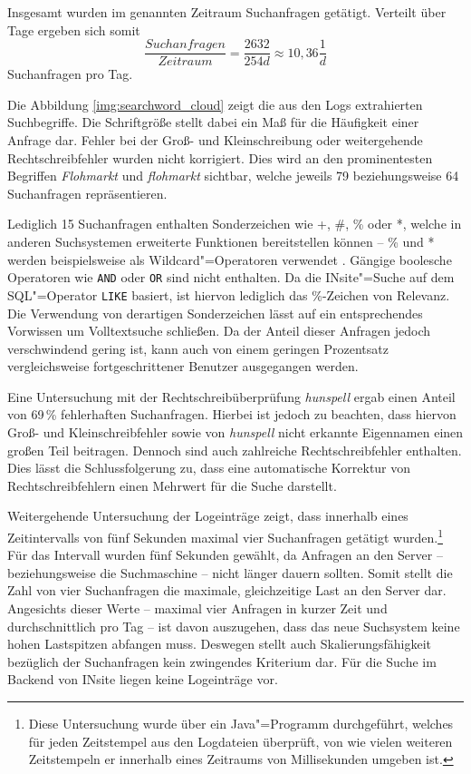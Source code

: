 Insgesamt wurden im genannten Zeitraum  Suchanfragen getätigt. Verteilt über  Tage ergeben sich somit
\begin{equation}
\frac{Suchanfragen}{Zeitraum} = \frac{2632}{254 d} \approx 10,36 \frac{1}{d}
\end{equation}
Suchanfragen pro Tag.

Die Abbildung \ref{img:searchword_cloud} zeigt die aus den Logs extrahierten Suchbegriffe. Die Schriftgröße stellt dabei ein Maß für die Häufigkeit einer Anfrage dar. Fehler bei der Groß- und Kleinschreibung oder weitergehende Rechtschreibfehler wurden nicht korrigiert. Dies wird an den prominentesten Begriffen \emph{Flohmarkt} und \emph{flohmarkt} sichtbar, welche jeweils 79 beziehungsweise 64 Suchanfragen repräsentieren.

Lediglich 15 Suchanfragen enthalten Sonderzeichen wie +, \#, \% oder *, welche in anderen Suchsystemen erweiterte Funktionen bereitstellen können -- \% und * werden beispielsweise als Wildcard"=Operatoren verwendet \cite[S. 111]{Wieken.2009}. Gängige boolesche Operatoren wie \texttt{AND} oder \texttt{OR} sind nicht enthalten. Da die INsite"=Suche auf dem SQL"=Operator \texttt{LIKE} basiert, ist hiervon lediglich das \%-Zeichen von Relevanz. Die Verwendung von derartigen Sonderzeichen lässt auf ein entsprechendes Vorwissen um Volltextsuche schließen. Da der Anteil dieser Anfragen jedoch verschwindend gering ist, kann auch von einem geringen Prozentsatz vergleichsweise fortgeschrittener Benutzer ausgegangen werden.

Eine Untersuchung mit der Rechtschreibüberprüfung \emph{hunspell} ergab einen Anteil von 69\,\% fehlerhaften Suchanfragen. Hierbei ist jedoch zu beachten, dass hiervon Groß- und Kleinschreibfehler sowie von \emph{hunspell} nicht erkannte Eigennamen einen großen Teil beitragen. Dennoch sind auch zahlreiche Rechtschreibfehler enthalten. Dies lässt die Schlussfolgerung zu, dass eine automatische Korrektur von Rechtschreibfehlern einen Mehrwert für die Suche darstellt.


Weitergehende Untersuchung der Logeinträge zeigt, dass innerhalb eines Zeitintervalls von fünf Sekunden maximal vier Suchanfragen getätigt wurden.\footnote{Diese Untersuchung wurde über ein Java"=Programm durchgeführt, welches für jeden Zeitstempel aus den Logdateien überprüft, von wie vielen weiteren Zeitstempeln er innerhalb eines Zeitraums von  Millisekunden umgeben ist.} Für das Intervall wurden fünf Sekunden gewählt, da Anfragen an den Server -- beziehungsweise die Suchmaschine -- nicht länger dauern sollten. Somit stellt die Zahl von vier Suchanfragen die maximale, gleichzeitige Last an den Server dar. Angesichts dieser Werte -- maximal vier Anfragen in kurzer Zeit und durchschnittlich  pro Tag -- ist davon auszugehen, dass das neue Suchsystem keine hohen Lastspitzen abfangen muss. Deswegen stellt auch Skalierungsfähigkeit bezüglich der Suchanfragen kein zwingendes Kriterium dar.
Für die Suche im Backend von INsite liegen keine Logeinträge vor.

